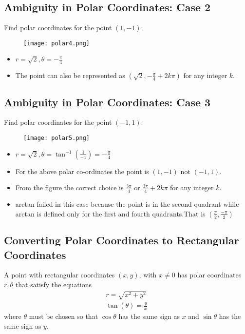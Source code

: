 \subsection{Ambiguity in Polar Coordinates: Case 2}
Find polar coordinates for the point \((1, -1)\):
\begin{figure}
    \centering
    \texttt{[image: polar4.png]}
\end{figure}
\begin{itemize}
    \item \(r = \sqrt{2}, \theta = -\frac{\pi}{4}\)
    \item The point can also be represented as \( (\sqrt{2}, -\frac{\pi}{4} + 2k\pi) \) for any integer \( k \).
\end{itemize}

\subsection{Ambiguity in Polar Coordinates: Case 3}
Find polar coordinates for the point \((-1, 1)\):
\begin{figure}
    \centering
    \texttt{[image: polar5.png]}
\end{figure}
\begin{itemize}
    \item \(r = \sqrt{2}, \theta = \tan^{-1} \left(\frac{1}{-1}\right) = -\frac{\pi}{4}\)
    \item For the above polar co-ordinates the point is \((1,-1)\) not \((-1, 1)\).
    \item From the figure the correct choice is \(\frac{3\pi}{4}\) or \(\frac{3\pi}{4} + 2k\pi\) for any integer \( k \).
    \item arctan failed in this case because the point is in the second quadrant while arctan is defined only for the first and fourth quadrants.That is \((\frac{\pi}{2},\frac{-\pi}{2})\)
\end{itemize}

\subsection{Converting Polar Coordinates to Rectangular Coordinates}
A point with rectangular coordinates \((x, y)\), with \(x \neq 0\) has polar coordinates \(r,\theta\) that satisfy the equations
\begin{align*}
    r = \sqrt{x^2 + y^2} \\
    \tan(\theta) = \frac{y}{x}
\end{align*}
where \(\theta\) must be chosen so that \(\cos \theta \) has the same sign as \(x\) and \(\sin \theta\) has the same sign as \(y\).

